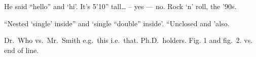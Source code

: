 He said ``hello'' and `hi'. It's 5'10'' tall\ldots{} -- yes --- no. Rock
`n' roll, the '90s.

``Nested `single' inside'' and `single ``double'' inside'. ``Unclosed
and 'also.

Dr.~Who vs.~Mr.~Smith e.g.~this i.e.~that. Ph.D.~holders. Fig. 1 and
fig.~2. vs. end of line.
